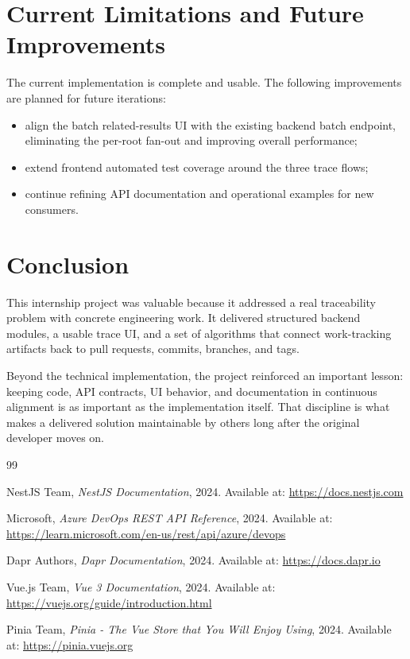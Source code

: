 \documentclass[12pt,a4paper]{report}
\begin{document}
\section{Current Limitations and Future Improvements}

The current implementation is complete and usable. The following improvements
are planned for future iterations:

\begin{itemize}
  \item align the batch related-results UI with the existing backend batch endpoint,
        eliminating the per-root fan-out and improving overall performance;
  \item extend frontend automated test coverage around the three trace flows;
  \item continue refining API documentation and operational examples for new consumers.
\end{itemize}

\section{Conclusion}

This internship project was valuable because it addressed a real traceability
problem with concrete engineering work. It delivered structured backend modules,
a usable trace UI, and a set of algorithms that connect work-tracking artifacts
back to pull requests, commits, branches, and tags.

\medskip
Beyond the technical implementation, the project reinforced an important lesson:
keeping code, API contracts, UI behavior, and documentation in continuous
alignment is as important as the implementation itself. That discipline is what
makes a delivered solution maintainable by others long after the original
developer moves on.

\newpage
{}
\renewcommand{\bibname}{Bibliography}
\begin{thebibliography}{99}

NestJS Team, \textit{NestJS Documentation}, 2024.
Available at: \url{https://docs.nestjs.com}

Microsoft, \textit{Azure DevOps REST API Reference}, 2024.
Available at: \url{https://learn.microsoft.com/en-us/rest/api/azure/devops}

Dapr Authors, \textit{Dapr Documentation}, 2024.
Available at: \url{https://docs.dapr.io}

Vue.js Team, \textit{Vue 3 Documentation}, 2024.
Available at: \url{https://vuejs.org/guide/introduction.html}

Pinia Team, \textit{Pinia - The Vue Store that You Will Enjoy Using}, 2024.
Available at: \url{https://pinia.vuejs.org}

\end{thebibliography}
\end{document}
